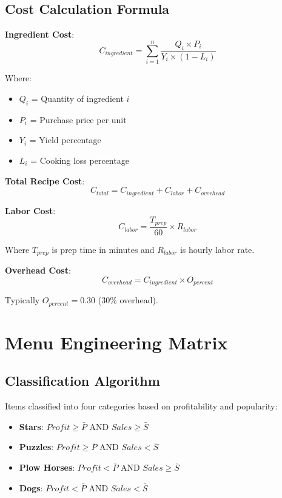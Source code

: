 \documentclass[11pt,a4paper]{article}
\begin{document}
\subsection{Cost Calculation Formula}

\textbf{Ingredient Cost}:
\begin{equation}
    C_{ingredient} = \sum_{i=1}^{n} \frac{Q_i \times P_i}{Y_i \times (1 - L_i)}
\end{equation}

Where:
\begin{itemize}
    \item $Q_i$ = Quantity of ingredient $i$
    \item $P_i$ = Purchase price per unit
    \item $Y_i$ = Yield percentage
    \item $L_i$ = Cooking loss percentage
\end{itemize}

\textbf{Total Recipe Cost}:
\begin{equation}
    C_{total} = C_{ingredient} + C_{labor} + C_{overhead}
\end{equation}

\textbf{Labor Cost}:
\begin{equation}
    C_{labor} = \frac{T_{prep}}{60} \times R_{labor}
\end{equation}

Where $T_{prep}$ is prep time in minutes and $R_{labor}$ is hourly labor rate.

\textbf{Overhead Cost}:
\begin{equation}
    C_{overhead} = C_{ingredient} \times O_{percent}
\end{equation}

Typically $O_{percent} = 0.30$ (30\% overhead).

\section{Menu Engineering Matrix}

\subsection{Classification Algorithm}

Items classified into four categories based on profitability and popularity:

\begin{itemize}
    \item \textbf{Stars}: $Profit \geq \bar{P}$ AND $Sales \geq \bar{S}$
    \item \textbf{Puzzles}: $Profit \geq \bar{P}$ AND $Sales < \bar{S}$
    \item \textbf{Plow Horses}: $Profit < \bar{P}$ AND $Sales \geq \bar{S}$
    \item \textbf{Dogs}: $Profit < \bar{P}$ AND $Sales < \bar{S}$
\end{itemize}
\end{document}
